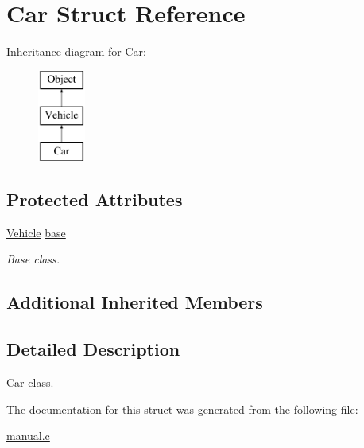 \hypertarget{structCar}{\section{Car Struct Reference}
\label{structCar}
}
Inheritance diagram for Car\-:\begin{figure}[H]
\begin{center}
\leavevmode
\includegraphics[height=3.000000cm]{structCar}
\end{center}
\end{figure}
\subsection*{Protected Attributes}
\begin{DoxyCompactItemize}
\item 
\hypertarget{structCar_ab8ff28306286da5a8b14fa9bdccaafaa}{\hyperlink{structVehicle}{Vehicle} \hyperlink{structCar_ab8ff28306286da5a8b14fa9bdccaafaa}{base}}\label{structCar_ab8ff28306286da5a8b14fa9bdccaafaa}

\begin{DoxyCompactList}\small\item\em Base class. \end{DoxyCompactList}\end{DoxyCompactItemize}
\subsection*{Additional Inherited Members}


\subsection{Detailed Description}
\hyperlink{structCar}{Car} class. 

The documentation for this struct was generated from the following file\-:\begin{DoxyCompactItemize}
\item 
\hyperlink{manual_8c}{manual.\-c}\end{DoxyCompactItemize}
